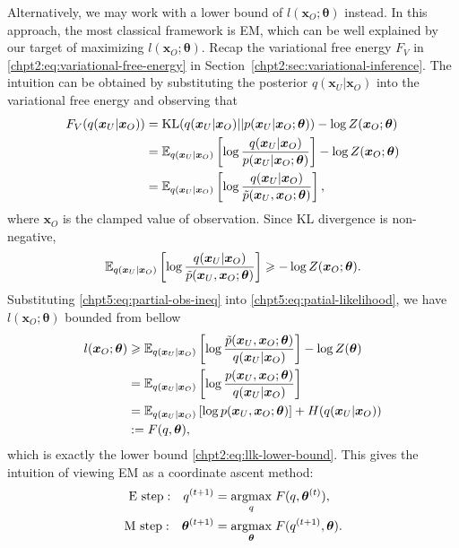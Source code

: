 Alternatively, we may work with a lower bound of $l(\bm{x}_O; \bm{\theta})$ instead. In this approach, the most classical framework is EM, which can be well explained by our target of maximizing $l(\bm{x}_O; \bm{\theta})$. Recap the variational free energy $F_V$ in \eqref{chpt2:eq:variational-free-energy} in Section~\ref{chpt2:sec:variational-inference}. The intuition can be obtained by substituting the posterior $q(\bm{x}_U|\bm{x}_O)$ into the variational free energy and observing that
\begin{align}
  F_V(q(\bm{x}_U|\bm{x}_O)) & = \mathrm{KL}(q(\bm{x}_U|\bm{x}_O) || p(\bm{x}_U|\bm{x}_O; \bm{\theta})) - \log{Z(\bm{x}_O; \bm{\theta})} \nonumber \\
                            &= \mathbb{E}_{q(\bm{x}_U|\bm{x}_O)}\left[  \log{\frac{q(\bm{x}_U|\bm{x}_O)}{{p}(\bm{x}_U| \bm{x}_O; \bm{\theta})}} \right] - \log{Z(\bm{x}_O;\bm{\theta})} \nonumber \\
                            &= \mathbb{E}_{q(\bm{x}_U|\bm{x}_O)}\left[ \log{\frac{q(\bm{x}_U|\bm{x}_O)}{\tilde{p}(\bm{x}_U, \bm{x}_O; \bm{\theta})}} \right],
\end{align}
where $\bm{x}_O$ is the clamped value of observation. Since KL divergence is non-negative,
\begin{equation}\label{chpt5:eq:partial-obs-ineq}
  \mathbb{E}_{q(\bm{x}_U|\bm{x}_O)}\left[ \log{\frac{q(\bm{x}_U|\bm{x}_O)}{\tilde{p}(\bm{x}_U, \bm{x}_O; \bm{\theta})}} \right] \geqslant - \log{Z(\bm{x}_O; \bm{\theta})}.
\end{equation}
Substituting \eqref{chpt5:eq:partial-obs-ineq} into \eqref{chpt5:eq:patial-likelihood}, we have $l(\bm{x}_O; \bm{\theta})$ bounded from bellow
\begin{align}\label{chpt5:eq:lower-bound-F}
  l(\bm{x}_O; \bm{\theta}) &\geqslant \mathbb{E}_{q(\bm{x}_U|\bm{x}_O)}\left[ \log{\frac{\tilde{p}(\bm{x}_U, \bm{x}_O; \bm{\theta})}{q(\bm{x}_U|\bm{x}_O)}} \right] - \log{Z(\bm{\theta})} \nonumber \\
                           & = \mathbb{E}_{q(\bm{x}_U|\bm{x}_O)}\left[ \log{\frac{{p}(\bm{x}_U, \bm{x}_O; \bm{\theta})}{q(\bm{x}_U|\bm{x}_O)}} \right] \nonumber \\
                           & = \mathbb{E}_{q(\bm{x}_U|\bm{x}_O)}\left[ \log{{p}(\bm{x}_U, \bm{x}_O; \bm{\theta})} \right] + H({q(\bm{x}_U|\bm{x}_O)}) \nonumber \\
                           & := F(q, \bm{\theta}),
\end{align}
which is exactly the lower bound \eqref{chpt2:eq:llk-lower-bound}. This gives the intuition of viewing EM as a coordinate ascent method:
\begin{align}
  \mathrm{E~step:}~~~ q^{(t+1)} &= \underset{q}{\operatorname{argmax}}\;{F(q, \bm{\theta}^{(t)})}, \\
  \mathrm{M~step:}~~~\bm{\theta}^{(t+1)} &= \underset{\bm{\theta}}{\operatorname{argmax}}\;{F(q^{(t+1)}, \bm{\theta})}.
\end{align}

